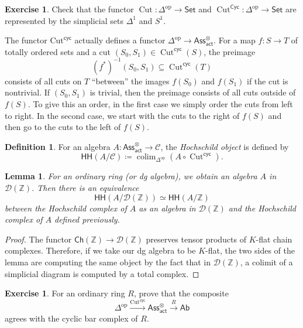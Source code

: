 \documentclass[10pt, oneside]{memoir}
\newtheorem{lem}[thm]{Lemma}
\theoremstyle{definition}
\newtheorem{defn}[thm]{Definition}
\newtheorem{exer}[thm]{Exercise}
\theoremstyle{remark}
\theoremstyle{plain}
\theoremstyle{definition}
\theoremstyle{remark}
\newcommand{\Z}{\mathbb{Z}}
\newcommand{\mc}[1]{\mathcal{#1}}
\newcommand{\mr}[1]{\mathrm{#1}}
\newcommand{\on}[1]{\operatorname{#1}}
\newcommand{\ms}[1]{\mathsf{#1}}
\newcommand{\1}{\mathbf{1}}
\newcommand{\2}{\mathbf{2}}
\newcommand{\3}{\mathbf{3}}
\newcommand{\HH}{\ms{HH}}
\DeclareMathOperator{\op}{op}
\DeclareMathOperator*{\colim}{colim}
\begin{document}
\begin{exer}
    Check that the functor \(\on{Cut} \colon \Delta^{\op} \to \ms{Set} \) and \(\on{Cut}^{\ms{Cyc}} \colon \Delta^{\op} \to \ms{Set} \) are represented by the simplicial sets \(\Delta^1 \) and \(S^1 \).
\end{exer}

The functor \(\mr{Cut}^{\ms{cyc}} \) actually defines a functor \(\Delta^{\op} \to \ms{Ass}_{\ms{act}}^{\otimes} \). For a map \(f \colon S \to T \) of totally ordered sets and a cut \((S_0, S_1) \in \on{Cut}^{\ms{cyc}}(S) \), the preimage
\[ (f^*)^{-1} (S_0, S_1) \subseteq \on{Cut}^{\ms{cyc}}(T) \]
consists of all cuts on \(T \) ``between'' the images \(f(S_0) \) and \(f(S_1) \) if the cut is nontrivial. If \((S_0, S_1) \) is trivial, then the preimage consists of all cuts outside of \(f(S) \). To give this an order, in the first case we simply order the cuts from left to right. In the second case, we start with the cuts to the right of \(f(S) \) and then go to the cuts to the left of \(f(S) \).

\begin{defn}
    For an algebra \(A \colon \ms{Ass}_{\ms{act}}^{\otimes} \to \mc{C} \), the \textit{Hochschild object} is defined by
    \[ \HH(A/\mc{C}) \coloneqq \colim_{\Delta^{\op}} (A \circ \on{Cut}^{\ms{cyc}}). \]
\end{defn}

\begin{lem}
    For an ordinary ring (or dg algebra), we obtain an algebra \(A \) in \(\mc{D}(\Z) \). Then there is an equivalence
    \[ \HH(A/\mc{D}(\Z)) \simeq \HH(A/\Z) \]
    between the Hochschild complex of \(A \) as an algebra in \(\mc{D}(\Z) \) and the Hochschild complex of \(A \) defined previously.
\end{lem}

\begin{proof}
    The functor \(\ms{Ch}(\Z) \to \mc{D}(\Z) \) preserves tensor products of \(K \)-flat chain complexes. Therefore, if we take our dg algebra to be \(K \)-flat, the two sides of the lemma are computing the same object by the fact that in \(\mc{D}(\Z) \), a colimit of a simplicial diagram is computed by a total complex.
\end{proof}

\begin{exer}
    For an ordinary ring \(R \), prove that the composite
    \[ \Delta^{\op} \xrightarrow{\on{Cut}^{\ms{cyc}}} \ms{Ass}_{\ms{act}}^{\otimes} \xrightarrow{R} \ms{Ab} \]
    agrees with the cyclic bar complex of \(R \).
\end{exer}
\end{document}
